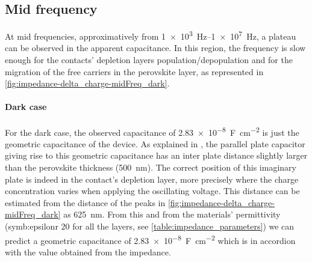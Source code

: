 \begin{figure}
{{			
			\label{fig:impedance-delta_charge}
		}
	}
\end{figure}

	\subsection{Mid frequency}
	At mid frequencies, approximatively from \SIrange{1e3}{1e7}{\Hz}, a plateau can be observed in the apparent capacitance.
	In this region, the frequency is slow enough for the contacts' depletion layers population/depopulation and for the migration of the free carriers in the perovskite layer, as represented in \cref{fig:impedance-delta_charge-midFreq_dark}.
	
	\paragraph{Dark case}
	For the dark case, the observed capacitance of \SI{2.83e-8}{\farad\per\square\cm} is just the geometric capacitance of the device.
	As explained in , the parallel plate capacitor giving rise to this geometric capacitance has an inter plate distance slightly larger than the perovskite thickness (\SI{500}{\nm}).
	The correct position of this imaginary plate is indeed in the contact's depletion layer, more precisely where the charge concentration varies when applying the oscillating voltage.
	This distance can be estimated from the distance of the peaks in \cref{fig:impedance-delta_charge-midFreq_dark} as \SI{625}{\nm}.
	From this and from the materials' permittivity (\gls{symb:epsilonr} $20$ for all the layers, see \cref{table:impedance_parameters}) we can predict a geometric capacitance of \SI{2.83e-8}{\farad\per\square\cm} which is in accordion with the value obtained from the impedance.
	
